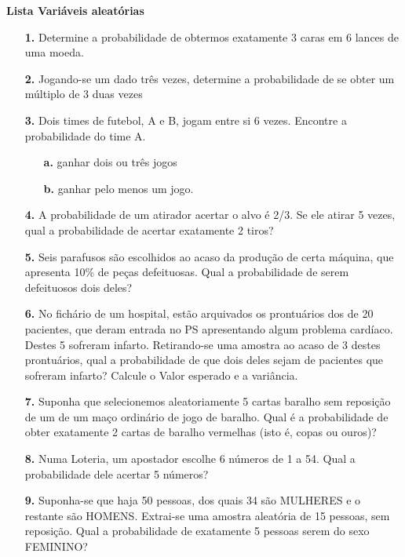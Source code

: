 \begin{center}
\textbf{\LARGE{Lista Variáveis aleatórias}}
\end{center}
\begin{itemize}
	\item[\textbf{1.}] Determine a probabilidade de obtermos exatamente 3 caras em 6 lances de uma moeda.
	\item[\textbf{2.}] Jogando-se um dado três vezes, determine a probabilidade de se obter um múltiplo de 3 duas vezes
	\resposta{} 
	\item[\textbf{3.}] Dois times de futebol, A e B, jogam entre si 6 vezes. Encontre a probabilidade do time A.
	\begin{itemize}
	    \item[\textbf{a.}] ganhar dois ou três jogos
	    \item[\textbf{b.}] ganhar pelo menos um jogo.
	\end{itemize}
	\item[\textbf{4.}] A probabilidade de um atirador acertar o alvo é 2/3. Se ele atirar 5 vezes, qual a probabilidade de acertar exatamente 2 tiros?
	\resposta{} 
	\item[\textbf{5.}] Seis parafusos são escolhidos ao acaso da produção de certa máquina, que apresenta 10\% de peças defeituosas. Qual a probabilidade de serem defeituosos dois deles?
	\resposta{} 
	\item[\textbf{6.}] No fichário de um hospital, estão arquivados os prontuários dos de 20 pacientes, que deram entrada no PS apresentando algum problema cardíaco. Destes 5 sofreram infarto. Retirando-se uma amostra ao acaso de 3 destes prontuários, qual a probabilidade de que dois deles sejam de pacientes que sofreram infarto? Calcule o Valor esperado e a variância.
	\resposta{} 
	\item[\textbf{7.}] Suponha que selecionemos aleatoriamente 5 cartas baralho sem reposição de um de um maço ordinário de jogo de baralho. Qual é a probabilidade de obter exatamente 2 cartas de baralho vermelhas (isto é, copas ou ouros)?
	\resposta{} 
	\item[\textbf{8.}] Numa Loteria, um apostador escolhe 6 números de 1 a 54. Qual a probabilidade dele acertar 5 números?
	\resposta{} 
	\item[\textbf{9.}] Suponha-se que haja 50 pessoas, dos quais 34 são MULHERES e o restante são HOMENS. Extrai-se uma amostra aleatória de 15 pessoas, sem reposição. Qual a probabilidade de exatamente 5 pessoas serem do sexo FEMININO?
	\resposta{} 
	

\end{itemize}
